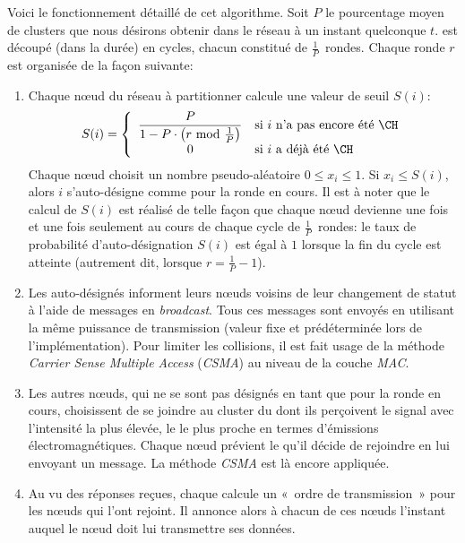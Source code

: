 Voici le fonctionnement détaillé de cet algorithme.
Soit $P$ le pourcentage moyen de clusters que nous désirons obtenir dans le réseau à un instant quelconque $t$.
\leach est découpé (dans la durée) en cycles, chacun constitué de $\frac{1}{P}$~rondes.
Chaque ronde $r$  est organisée de la façon suivante:
\begin{enumerate}
    \item Chaque nœud du réseau à partitionner calcule une valeur de seuil $S(i)$:
        \[
            S(i) = \left\{
            \begin{array}{cl}
                \displaystyle \frac{P}{1-P\cdot\left(r\mbox{ mod }\frac{1}{P}\right)} & \mbox{si }i\mbox{ n'a pas encore été \CH}\\
                                                                                    0 & \mbox{si }i\mbox{ a déjà été \CH}
            \end{array}
            \right.
        \]
        Chaque nœud choisit un nombre pseudo-aléatoire $0 \le x_{i}\le 1$.
        Si $x_{i} \le S(i)$, alors $i$ s'auto-désigne comme \CH pour la ronde en cours.
        Il est à noter que le calcul de $S(i)$ est réalisé de telle façon que chaque nœud devienne \ch une fois et une fois seulement au cours de chaque cycle de $\frac{1}{P}$~rondes: le taux de probabilité d'auto-désignation $S(i)$ est égal à $1$ lorsque la fin du cycle est atteinte (autrement dit, lorsque $r = \frac{1}{P}-1$).
    \item Les \chs auto-désignés informent leurs nœuds voisins de leur changement de statut à l'aide de messages en \textit{broadcast}.
        Tous ces messages sont envoyés en utilisant la même puissance de transmission (valeur fixe et prédéterminée lors de l'implémentation).
        Pour limiter les collisions, il est fait usage de la méthode \textit{Carrier Sense Multiple Access} (\textit{CSMA}) au niveau de la couche \textit{MAC}.
    \item Les autres nœuds, qui ne se sont pas désignés en tant que \chs pour la ronde en cours, choisissent de se joindre au cluster du \CH dont ils perçoivent le signal avec l'intensité la plus élevée, \cad le \CH le plus proche en termes d'émissions électromagnétiques.
        Chaque nœud prévient le \ch qu'il décide de rejoindre en lui envoyant un message.
        La méthode \textit{CSMA} est là encore appliquée.
    \item Au vu des réponses reçues, chaque \ch calcule un «~ordre de transmission~» pour les nœuds qui l'ont rejoint.
        Il annonce alors à chacun de ces nœuds l'instant auquel le nœud doit lui transmettre ses données.

\end{enumerate}
